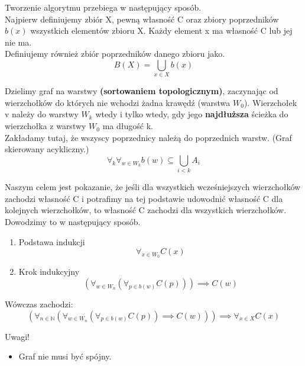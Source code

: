 \documentclass[paper=a4, fontsize=11pt]{article}
\begin{document}
\begin{mydef} 
Tworzenie algorytmu przebiega w następujący sposób. \\

Najpierw definiujemy zbiór X, pewną własność C oraz zbiory poprzedników $b(x)$ wszystkich elementów zbioru X. Każdy element x ma własność C lub jej nie ma.\\

Definiujemy również zbiór poprzedników danego zbioru jako.
\begin{displaymath}
B(X) = \bigcup_{x \in X} b(x)
\end{displaymath}

Dzielimy graf na warstwy \textbf{(sortowaniem topologicznym)}, zaczynając od wierzchołków do których nie wchodzi żadna krawędź (warstwa $W_0$). Wierzchołek v należy do warstwy $W_k$ wtedy i tylko wtedy, gdy jego \textbf{najdłuższa} ścieżka do wierzchołka z warstwy $W_0$ ma długość k. \\

Zakładamy tutaj, że wszyscy poprzednicy należą do poprzednich warstw. (Graf skierowany acykliczny.)
\begin{displaymath}
\forall_k \forall_{w \in W_k} b(w) \subseteq \bigcup_{i < k} A_i
\end{displaymath}

Naszym celem jest pokazanie, że jeśli dla wszystkich wcześniejszych wierzchołków zachodzi własność C i potrafimy na tej podstawie udowodnić własność C dla kolejnych wierzchołków, to własność C zachodzi dla wszystkich wierzchołków.
Dowodzimy to w następujący sposób.


\begin{enumerate}
\item Podstawa indukcji
\begin{displaymath}
\forall_{x \in W_{0}} C(x)
\end{displaymath} 
\item Krok indukcyjny
\begin{displaymath}
(\forall_{w \in W_n} (\forall_{p \in b(w)} C(p))) \implies C(w)
\end{displaymath}
\end{enumerate}

Wówczas zachodzi:
\begin{displaymath}
(\forall_{n \in \mathbb{N}}( \forall_{w \in W_n} (\forall_{p \in b(w)} C(p)) \implies C(w))) \implies \forall_{x \in X} C(x)
\end{displaymath}

Uwagi!
\begin{itemize}
\item Graf nie musi być spójny.
\end{itemize}
\end{mydef}
\end{document}

